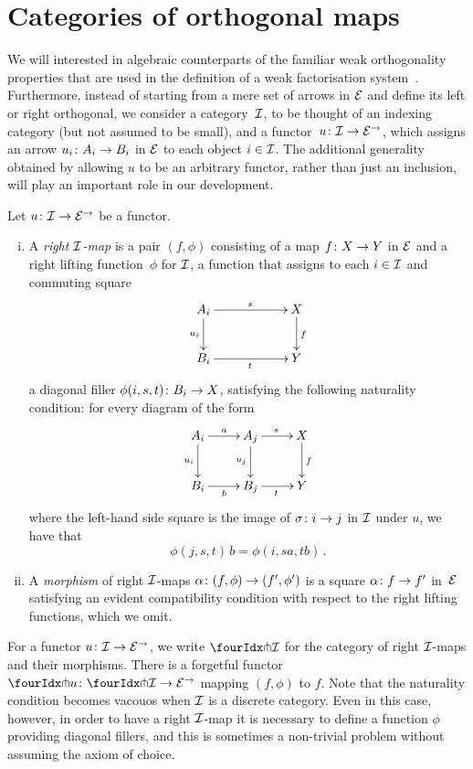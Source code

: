 \documentclass[reqno,10pt,a4paper,oneside]{amsart}
\begin{document}
\section{Categories of orthogonal maps} 
\label{sec-orthog-functors}



 We will interested in algebraic counterparts of the familiar weak orthogonality properties that are used
 in the definition of a weak factorisation system~\cite{bousfield-wfs}. Furthermore, 
 instead of starting from a mere set of arrows in $\catE$ and define its left or right orthogonal, 
 we consider a category~$\cal{I}$, to be thought of an indexing category (but not assumed to be small), and a functor~$u \co \cal{I} \to \catE^\to$, which assigns an arrow $u_i \co A_i \to B_i$ in $\catE$ to each object $i \in \cal{I}$. The  additional generality obtained by allowing $u$ to be an arbitrary functor,
 rather than just an inclusion,  will play an important role in our development. 
 

 \begin{definition} Let $u \co \cal{I} \to \catE^\to$ be a functor. 
 \begin{enumerate}[(i)] 
 \item  A \emph{right $\cal{I}$-map}
 is a pair $(f, \phi)$ consisting of a map $f \co X \to Y$ in $\cal{E}$ and a right lifting function~$\phi$ for $\cal{I}$, \ie 
 a function that assigns to each $i \in \cal{I}$ and commuting square
\[
\xymatrix@C=2cm{
A_i \ar[r]^{s}   \ar[d]_{u_i} & X \ar[d]^f \\
B_i \ar[r]_{t} & Y}
\]
a diagonal filler $\phi(i,s, t) \co B_i \to X$, satisfying the following naturality 
condition: for every diagram of the form
\[
\xymatrix{
A_i \ar[r]^a \ar[d]_{u_i} & A_j \ar[r]^{s}  \ar[d]_{u_j} & X \ar[d]^f   \\
B_i \ar[r]_{b}  & B_j  \ar[r]_{t}  & Y }
\]
where the left-hand side square is the image of $\sigma \co i \to j$ in $\cal{I}$ under $u$, 
we have that 
\[
\phi(j, s, t) \, b = \phi(i, s  a, t  b) \, .
\]
\item A \emph{morphism} of right $\cal{I}$-maps $\alpha \co (f, \phi) \to (f', \phi')$ is a 
square $\alpha \co f \to f'$ in~$\catE$ satisfying an evident compatibility condition 
with respect to the right lifting functions, which we omit. 
\end{enumerate}
\end{definition}

For a functor $u \co \cal{I} \to \catE^\to$, we write $\liftr{\cal{I}}$ for the category  of 
right $\cal{I}$-maps and their morphisms. There is a forgetful functor~$\liftr{u} \co \liftr{\cal{I}} \to \catE^\to$
mapping $(f, \phi)$ to $f$. Note that the naturality condition becomes vacouos when $\cal{I}$ is a discrete category. Even in this case, however, in order to have a right $\cal{I}$-map it is necessary to define a function $\phi$ providing 
diagonal fillers, and this is sometimes a non-trivial problem without assuming the axiom of choice.
\end{document}
